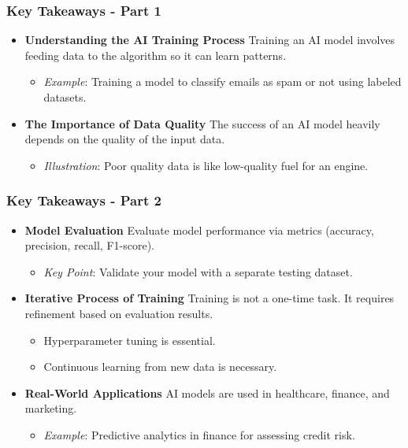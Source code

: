 \documentclass{beamer}
\begin{document}
\begin{frame}[fragile]
    \frametitle{Key Takeaways - Part 1}
    \begin{itemize}
        \item \textbf{Understanding the AI Training Process}  
        Training an AI model involves feeding data to the algorithm so it can learn patterns.
        \begin{itemize}
            \item \textit{Example}: Training a model to classify emails as spam or not using labeled datasets.
        \end{itemize}
        
        \item \textbf{The Importance of Data Quality}  
        The success of an AI model heavily depends on the quality of the input data.
        \begin{itemize}
            \item \textit{Illustration}: Poor quality data is like low-quality fuel for an engine.
        \end{itemize}
    \end{itemize}
\end{frame}

\begin{frame}[fragile]
    \frametitle{Key Takeaways - Part 2}
    \begin{itemize}
        \item \textbf{Model Evaluation}  
        Evaluate model performance via metrics (accuracy, precision, recall, F1-score).
        \begin{itemize}
            \item \textit{Key Point}: Validate your model with a separate testing dataset.
        \end{itemize}

        \item \textbf{Iterative Process of Training}  
        Training is not a one-time task. It requires refinement based on evaluation results.
        \begin{itemize}
            \item Hyperparameter tuning is essential.
            \item Continuous learning from new data is necessary.
        \end{itemize}

        \item \textbf{Real-World Applications}  
        AI models are used in healthcare, finance, and marketing.
        \begin{itemize}
            \item \textit{Example}: Predictive analytics in finance for assessing credit risk.
        \end{itemize}
    \end{itemize}
\end{frame}
\end{document}
